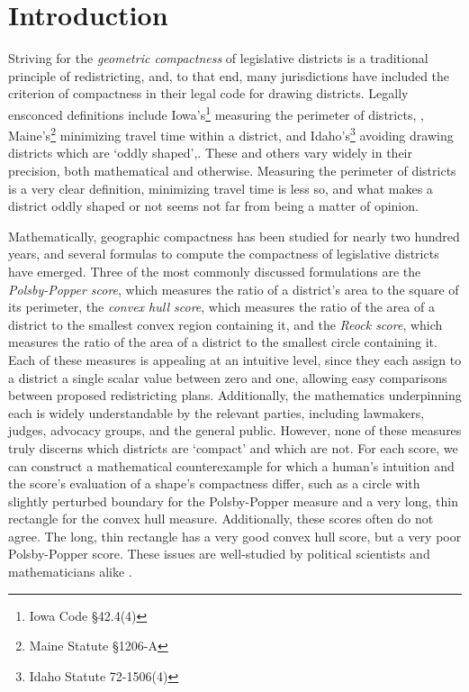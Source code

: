 \section{Introduction}
Striving for the \textit{geometric compactness} of legislative
districts is a traditional principle of redistricting, and, to that
end, many jurisdictions have included the criterion of compactness in
their legal code for drawing districts.  Legally ensconced definitions include Iowa's\footnote{Iowa Code \S42.4(4)} measuring the perimeter of districts, , Maine's\footnote{Maine Statute \S1206-A} minimizing travel time within a district, and Idaho's\footnote{Idaho Statute 72-1506(4)} avoiding 
drawing districts which are `oddly shaped',.  These and others vary widely in their 
precision, both mathematical and otherwise.  Measuring the perimeter of districts is a very clear definition, minimizing travel time is less so, and what makes a district oddly shaped or not seems not far from being a matter of opinion. 


Mathematically, geographic compactness has been studied for nearly two hundred years, and several formulas to compute the compactness of legislative districts have emerged.
 Three of the most commonly discussed formulations are the \textit{Polsby-Popper score}, which
measures the ratio of a district's area to the square of its
perimeter, the \textit{convex hull score}, which measures the ratio
of the area of a district to the smallest convex region containing it,
and the \textit{Reock score}, which measures the ratio of the area of
a district to the smallest circle containing it.  Each of these
measures is appealing at an intuitive level, since they each assign to
a district a single scalar value between zero and one, allowing easy
comparisons between proposed redistricting plans. Additionally, the
mathematics underpinning each is widely understandable by the relevant
parties, including lawmakers, judges, advocacy groups, and the general
public.  However, none of these measures truly discerns which districts are `compact' and which are not. 
For each score, we can construct a 
mathematical counterexample for which
a human's intuition and the score's evaluation of a shape's
compactness differ, such as a circle with slightly perturbed boundary
for the Polsby-Popper measure and a very long, thin rectangle for the
convex hull measure. Additionally, these scores often do not agree.
The long, thin rectangle has a very good convex hull score, but a very
poor Polsby-Popper score.  These issues are well-studied by political
scientists and mathematicians alike
\cite{polsby1991third,frolov1975shape,maceachren1985compact}.




